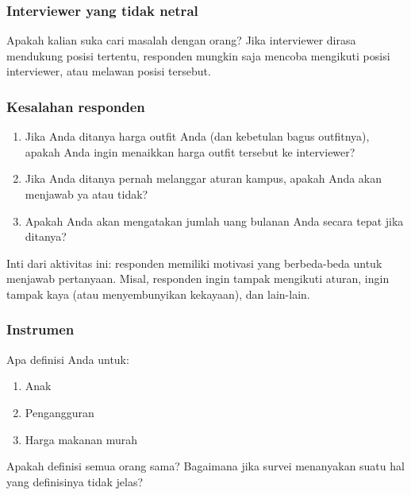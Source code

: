 \documentclass[
  letterpaper,
  DIV=11,
  numbers=noendperiod]{scrreprt}
\providecommand{\tightlist}{%
  \setlength{\itemsep}{0pt}\setlength{\parskip}{0pt}}\usepackage{longtable,booktabs,array}
\begin{document}
\hypertarget{interviewer-yang-tidak-netral}{%
\subsubsection{Interviewer yang tidak
netral}\label{interviewer-yang-tidak-netral}}

Apakah kalian suka cari masalah dengan orang? Jika interviewer dirasa
mendukung posisi tertentu, responden mungkin saja mencoba mengikuti
posisi interviewer, atau melawan posisi tersebut.

\hypertarget{kesalahan-responden}{%
\subsubsection{Kesalahan responden}\label{kesalahan-responden}}

\begin{enumerate}
\def\labelenumi{\arabic{enumi}.}
\tightlist
\item
  Jika Anda ditanya harga outfit Anda (dan kebetulan bagus outfitnya),
  apakah Anda ingin menaikkan harga outfit tersebut ke interviewer?
\item
  Jika Anda ditanya pernah melanggar aturan kampus, apakah Anda akan
  menjawab ya atau tidak?
\item
  Apakah Anda akan mengatakan jumlah uang bulanan Anda secara tepat jika
  ditanya?
\end{enumerate}

Inti dari aktivitas ini: responden memiliki motivasi yang berbeda-beda
untuk menjawab pertanyaan. Misal, responden ingin tampak mengikuti
aturan, ingin tampak kaya (atau menyembunyikan kekayaan), dan lain-lain.

\hypertarget{instrumen}{%
\subsubsection{Instrumen}\label{instrumen}}

Apa definisi Anda untuk:

\begin{enumerate}
\def\labelenumi{\arabic{enumi}.}
\tightlist
\item
  Anak
\item
  Pengangguran
\item
  Harga makanan murah
\end{enumerate}

Apakah definisi semua orang sama? Bagaimana jika survei menanyakan suatu
hal yang definisinya tidak jelas?
\end{document}
